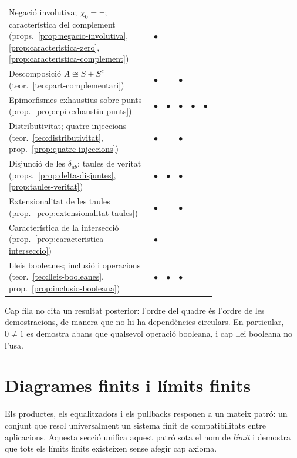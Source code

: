 \begin{observacio}
\begin{center}
\begin{tabular}{@{}>{\raggedright\arraybackslash}p{0.70\linewidth}ccccc@{}}
Negació involutiva; \(\chi_0=\neg\); característica del complement (props.~\ref{prop:negacio-involutiva}, \ref{prop:caracteristica-zero}, \ref{prop:caracteristica-complement}) & \(\bullet\) & & & & \\
Descomposició \(A\cong S+S^c\) (teor.~\ref{teo:part-complementari}) & \(\bullet\) & & \(\bullet\) & & \\
Epimorfismes exhaustius sobre punts (prop.~\ref{prop:epi-exhaustiu-punts}) & \(\bullet\) & \(\bullet\) & \(\bullet\) & \(\bullet\) & \(\bullet\) \\
Distributivitat; quatre injeccions (teor.~\ref{teo:distributivitat}, prop.~\ref{prop:quatre-injeccions}) & \(\bullet\) & & \(\bullet\) & & \\
Disjunció de les \(\delta_{ab}\); taules de veritat (props.~\ref{prop:delta-disjuntes}, \ref{prop:taules-veritat}) & \(\bullet\) & \(\bullet\) & \(\bullet\) & & \\
Extensionalitat de les taules (prop.~\ref{prop:extensionalitat-taules}) & \(\bullet\) & & \(\bullet\) & & \\
Característica de la intersecció (prop.~\ref{prop:caracteristica-interseccio}) & \(\bullet\) & & & & \\
Lleis booleanes; inclusió i operacions (teor.~\ref{teo:lleis-booleanes}, prop.~\ref{prop:inclusio-booleana}) & \(\bullet\) & \(\bullet\) & \(\bullet\) & & \\
\bottomrule
\end{tabular}
\end{center}
Cap fila no cita un resultat posterior: l'ordre del quadre és l'ordre de les demostracions, de manera que no hi ha dependències circulars. En particular, \(0\ne1\) es demostra abans que qualsevol operació booleana, i cap llei booleana no l'usa.
\end{observacio}

\section{Diagrames finits i límits finits}\label{sec:limits-finits}

Els productes, els equalitzadors i els pullbacks responen a un mateix patró: un conjunt que resol universalment un sistema finit de compatibilitats entre aplicacions. Aquesta secció unifica aquest patró sota el nom de \emph{límit} i demostra que tots els límits finits existeixen sense afegir cap axioma.

